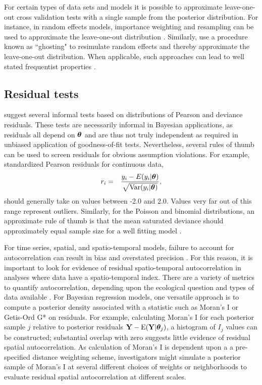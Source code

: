 \documentclass[12pt,english]{article}
\begin{document}
\begin{spacing}{1.9}
For certain types of data sets and models it is possible to
approximate leave-one-out cross validation tests with a single sample
from the posterior distribution.  For instance, in random effects
models, importance weighting and resampling can be used to approximate
the leave-one-out distribution
\citep{SternCressie2000,QiuEtAl2016}. Similarly,
\citet{MarshallSpiegelhalter2007} use a procedure known as ``ghosting"
to resimulate random effects and thereby approximate the leave-one-out
distribution.  When applicable, such approaches can lead to well
stated frequentist properties \citep[i.e., a uniform distribution of
p-values under the null;][]{QiuEtAl2016}.

\subsection{Residual tests}

\citet{LunnEtAl2013} suggest several informal tests based on
distributions of Pearson and deviance residuals.  These tests are
necessarily informal in Bayesian applications, as residuals all depend
on $\boldsymbol{\theta}$ and are thus not truly independent as required in
unbiased application of goodness-of-fit tests.  Nevertheless, several
rules of thumb can be used to screen residuals for obvious assumption
violations.  For example, standardized Pearson residuals for
continuous data,
\begin{eqnarray*}
  r_i & = & \frac{y_i - E(y_i|\boldsymbol{\theta})}{\sqrt{\textrm{Var}(y_i | \boldsymbol{\theta})}},
\end{eqnarray*}
should generally take on values between -2.0 and 2.0.  Values very far
out of this range represent outliers.  Similarly, for the Poisson and
binomial distributions, an approximate rule of thumb is that the mean
saturated deviance should approximately equal sample size for a well
fitting model \citep{LunnEtAl2013}.

For time series, spatial, and spatio-temporal models, failure to
account for autocorrelation can result in bias and overstated
precision \citep{LichsteinEtAl2002}.  For this reason, it is important
to look for evidence of residual spatio-temporal autocorrelation in
analyses where data have a spatio-temporal index.  There are a variety
of metrics to quantify autocorrelation, depending upon the ecological
question and types of data available \cite[e.g.,][]{PerryEtAl2002}.
For Bayesian regression models, one versatile approach is to compute a
posterior density associated with a statistic such as Moran's I
\citep{Moran1950} or Getis-Ord G* \citep{GetisOrd1992} on residuals.
For example, calculating Moran's I for each posterior sample $j$
relative to posterior residuals
${\bf Y} - \textrm{E}({\bf Y} | \boldsymbol{\theta}_j)$, a histogram
of $I_j$ values can be constructed; substantial overlap with zero
suggests little evidence of residual spatial autocorrelation.  As
calculation of Moran's I is dependent upon a a pre-specified distance
weighting scheme, investigators might simulate a posterior sample of
Moran's I at several different choices of weights or neighborhoods to
evaluate residual spatial autocorrelation at different scales.


\end{spacing}
\end{document}

